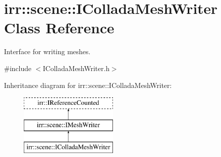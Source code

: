 \hypertarget{classirr_1_1scene_1_1IColladaMeshWriter}{}\section{irr\+:\+:scene\+:\+:I\+Collada\+Mesh\+Writer Class Reference}
\label{classirr_1_1scene_1_1IColladaMeshWriter}


Interface for writing meshes.  




{\ttfamily \#include $<$I\+Collada\+Mesh\+Writer.\+h$>$}

Inheritance diagram for irr\+:\+:scene\+:\+:I\+Collada\+Mesh\+Writer\+:\begin{figure}[H]
\begin{center}
\leavevmode
\includegraphics[height=3.000000cm]{classirr_1_1scene_1_1IColladaMeshWriter}
\end{center}
\end{figure}

